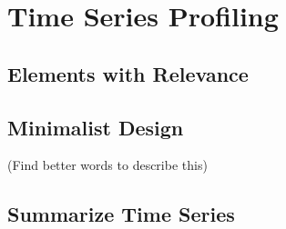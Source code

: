 \section{Time Series Profiling}

\subsection{Elements with Relevance}
\subsection{Minimalist Design}
(Find better words to describe this)
\subsection{Summarize Time Series}



%


